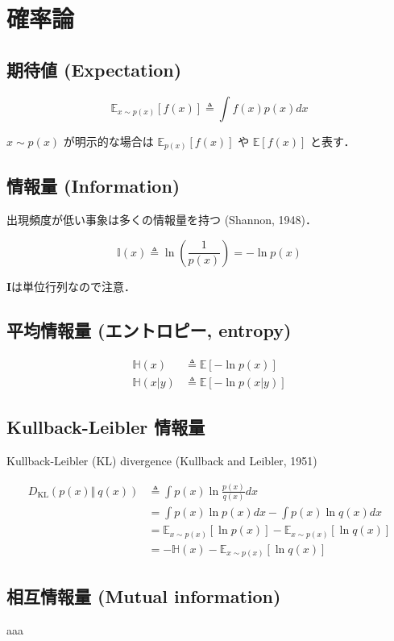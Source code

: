 \section{確率論}
\subsection{期待値 (Expectation)}


\begin{equation}
\mathbb{E}_{x\sim p(x)}\left[f(x)\right]\triangleq\int f(x)p(x)dx
\end{equation}


$x\sim p(x)$ が明示的な場合は $\mathbb{E}_{p(x)}\left[f(x)\right]$ や $\mathbb{E}\left[f(x)\right]$ と表す．

\subsection{情報量 (Information)}
出現頻度が低い事象は多くの情報量を持つ (Shannon, 1948)．


\begin{equation}
\mathbb{I}(x)\triangleq\ln\left(\frac{1}{p(x)}\right)=-\ln p(x)
\end{equation}


$\mathbf{I}$は単位行列なので注意．

\subsection{平均情報量 (エントロピー, entropy)}


\begin{align}
\mathbb{H}(x)&\triangleq\mathbb{E}[-\ln p(x)]\\
\mathbb{H}(x\vert y)&\triangleq\mathbb{E}[-\ln p(x\vert y)]
\end{align}


\subsection{Kullback-Leibler 情報量}
Kullback-Leibler (KL) divergence (Kullback and Leibler, 1951)


\begin{align}
D_{\text{KL}}\left(p(x) \Vert\ q(x)\right)&\triangleq\int p(x) \ln \frac{p(x)}{q(x)} dx\\
&=\int p(x) \ln p(x) dx-\int p(x) \ln q(x) dx\\
&=\mathbb{E}_{x\sim p(x)}[\ln p(x)]-\mathbb{E}_{x\sim p(x)}[\ln q(x)]\\
&=-\mathbb{H}(x)-\mathbb{E}_{x\sim p(x)}[\ln q(x)]
\end{align}


\subsection{相互情報量 (Mutual information)}
aaa
